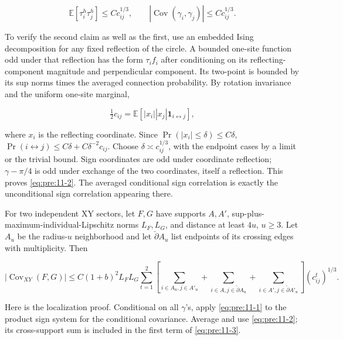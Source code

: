 \begin{equation}
\mathbb E[\tau_i^h\tau_j^h]\leq Cc_{ij}^{1/3},\qquad
|\operatorname{Cov}(\gamma_i,\gamma_j)|\leq Cc_{ij}^{1/3}.
\label{eq:pre:11-2}
\end{equation}

To verify the second claim as well as the first, use an embedded Ising decomposition for any fixed reflection of the circle. A bounded one-site function odd under that reflection has the form \(\tau_i f_i\) after conditioning on its reflecting-component magnitude and perpendicular component. Its two-point is bounded by its sup norms times the averaged connection probability. By rotation invariance and the uniform one-site marginal,

\[
\tfrac12c_{ij}=\mathbb E[|x_i||x_j|\mathbf1_{i\leftrightarrow j}],
\]

where \(x_i\) is the reflecting coordinate. Since \(\Pr(|x_i|\leq\delta)\leq C\delta\),
\(\Pr(i\leftrightarrow j)\leq C\delta+C\delta^{-2}c_{ij}\).
Choose \(\delta\asymp c_{ij}^{1/3}\), with the endpoint cases by a limit or the trivial bound. Sign coordinates are odd under coordinate reflection; \(\gamma-\pi/4\) is odd under exchange of the two coordinates, itself a reflection. This proves \eqref{eq:pre:11-2}. The averaged conditional sign correlation is exactly the unconditional sign correlation appearing there.

For two independent XY sectors, let \(F,G\) have supports \(A,A'\), sup-plus-maximum-individual-Lipschitz norms \(L_F,L_G\), and distance at least \(4u\), \(u\geq3\). Let \(A_u\) be the radius-\(u\) neighborhood and let \(\check\partial A_u\) list endpoints of its crossing edges with multiplicity. Then

\begin{equation}
|\operatorname{Cov}_{XY}(F,G)|
\leq C(1+b)^2L_FL_G
\sum_{t=1}^2\left[
\sum_{i\in A_u,j\in A'_u}
+\sum_{i\in A,j\in\check\partial A_u}
+\sum_{i\in A',j\in\check\partial A'_u}
\right](c^t_{ij})^{1/3}.
\label{eq:pre:11-3}
\end{equation}

Here is the localization proof. Conditional on all \(\gamma\)'s, apply \eqref{eq:pre:11-1} to the product sign system for the conditional covariance. Average and use \eqref{eq:pre:11-2}; its cross-support sum is included in the first term of \eqref{eq:pre:11-3}.

